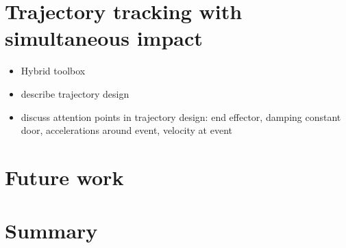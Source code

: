 \documentclass[../DC2017114Bouma.tex]{subfiles}
\begin{document}
\section{Trajectory tracking with simultaneous impact}
\begin{itemize}
\item Hybrid toolbox
\item describe trajectory design
\item discuss attention points in trajectory design: end effector, damping constant door, accelerations around event, velocity at event
\end{itemize}
\section{Future work}


\section{Summary}
\end{document}
